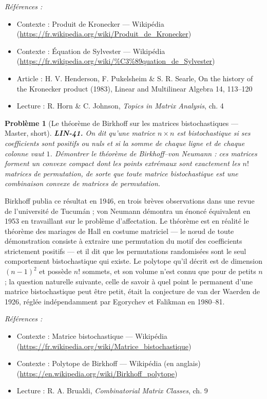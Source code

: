 \documentclass[11pt]{article}
\newtheorem{problem}{Problème}
\newenvironment{refs}{\par\small\noindent\emph{Références :}\begin{itemize}\setlength\itemsep{0pt}}{\end{itemize}\normalsize}
\begin{document}
\begin{refs}
\item Contexte : Produit de Kronecker --- Wikipédia (\url{https://fr.wikipedia.org/wiki/Produit_de_Kronecker})
\item Contexte : Équation de Sylvester --- Wikipédia (\url{https://fr.wikipedia.org/wiki/%C3%89quation_de_Sylvester})
\item Article : H. V. Henderson, F. Pukelsheim \& S. R. Searle, \og{} On the history of the Kronecker product \fg{} (1983), Linear and Multilinear Algebra 14, 113--120
\item Lecture : R. Horn \& C. Johnson, \textit{Topics in Matrix Analysis}, ch. 4
\end{refs}

\bigskip

\begin{problem}[{Le théorème de Birkhoff sur les matrices bistochastiques --- Master, short}]
\textbf{LIN-41.} On dit qu'une matrice $n \times n$ est \textit{bistochastique}
si ses coefficients sont positifs ou nuls et si la somme de chaque ligne et de chaque colonne vaut
$1$. Démontrer le théorème de Birkhoff--von Neumann : ces matrices forment un convexe compact dont
les points extrémaux sont exactement les $n!$ matrices de permutation, de sorte que toute matrice
bistochastique est une combinaison convexe de matrices de permutation.
\end{problem}

\noindent Birkhoff publia ce résultat en 1946, en trois brèves observations dans une revue de
l'université de Tucumán ; von Neumann démontra un énoncé équivalent en 1953 en travaillant sur le
problème d'affectation. Le théorème est en réalité le théorème des mariages de Hall en costume
matriciel --- le n\oe{}ud de toute démonstration consiste à extraire une permutation du motif des
coefficients strictement positifs --- et il dit que les \og{} permutations randomisées \fg{} sont le seul
comportement bistochastique qui existe. Le polytope qu'il décrit est de dimension $(n-1)^2$ et
possède $n!$ sommets, et son volume n'est connu que pour de petits $n$ ; la question naturelle
suivante, celle de savoir à quel point le permanent d'une matrice bistochastique peut être petit,
était la conjecture de van der Waerden de 1926, réglée indépendamment par Egorychev et Falikman en
1980--81.

\begin{refs}
\item Contexte : Matrice bistochastique --- Wikipédia (\url{https://fr.wikipedia.org/wiki/Matrice_bistochastique})
\item Contexte : Polytope de Birkhoff --- Wikipédia (en anglais) (\url{https://en.wikipedia.org/wiki/Birkhoff_polytope})
\item Lecture : R. A. Brualdi, \textit{Combinatorial Matrix Classes}, ch. 9
\end{refs}
\end{document}
